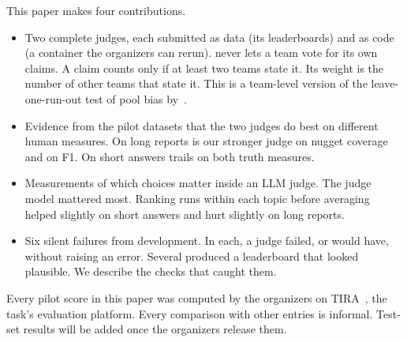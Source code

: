 This paper makes four contributions.
\begin{itemize}
  \item Two complete judges, each submitted as data (its leaderboards) and as code
    (a container the organizers can rerun).  never lets a team
    vote for its own claims. A claim counts only if at least two teams state it. Its weight is the number of other teams that state it. This is a team-level version of the leave-one-run-out test of pool bias by~\citet{zobel1998reliable}.
  \item Evidence from the pilot datasets that the two judges do best on different
    human measures. On long reports  is our stronger judge on
    nugget coverage and  on F1. On short answers
     trails on both truth measures.
  \item Measurements of which choices matter inside an LLM judge. The judge model
    mattered most. Ranking runs within each topic before averaging helped slightly
    on short answers and hurt slightly on long reports.
  \item Six silent failures from development. In each, a judge failed, or would
    have, without raising an error. Several produced a leaderboard that looked
    plausible. We describe the checks that caught them.
\end{itemize}

Every pilot score in this paper was computed by the organizers on TIRA~\cite{froebe2023tira}, the task's evaluation platform. Every comparison with other entries is informal.
Test-set results will be added once the organizers release them.
